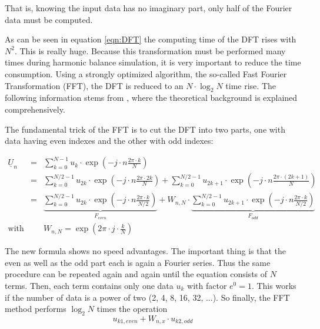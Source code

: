 \addvspace{12pt}

That is, knowing the input data has no imaginary part, only half of
the Fourier data must be computed.

\addvspace{12pt}

As can be seen in equation \ref{eqn:DFT} the computing time of the
DFT rises with $N^2$. This is really huge. Because this transformation
must be performed many times during harmonic balance simulation, it is
very important to reduce the time consumption. Using a strongly
optimized algorithm, the so-called Fast Fourier Transformation (FFT),
the DFT is reduced to an $N\cdot\log_2 N$ time rise.
The following information stems from \cite{Press},
where the theoretical background is explained comprehensively.

\addvspace{12pt}

The fundamental trick of the FFT is to cut the DFT into two parts,
one with data having even indexes and the other with odd indexes:

\begin{eqnarray}
\underline{U}_n & = &
  \sum_{k=0}^{N-1} u_k\cdot \exp\left( -j\cdot n\frac{2\pi\cdot k}{N} \right) \\
  & = & \sum_{k=0}^{N/2-1} u_{2k}\cdot
        \exp\left( -j\cdot n\frac{2\pi\cdot 2k}{N} \right) +
        \sum_{k=0}^{N/2-1} u_{2k+1}\cdot
        \exp\left( -j\cdot n\frac{2\pi\cdot (2k+1)}{N} \right) \\
  & = & \underbrace{ \sum_{k=0}^{N/2-1} u_{2k}\cdot
        \exp\left( -j\cdot n\frac{2\pi\cdot k}{N/2} \right) }_{F_{even}} +
        W_{n,N}\cdot \underbrace{ \sum_{k=0}^{N/2-1} u_{2k+1}\cdot
        \exp\left( -j\cdot n\frac{2\pi\cdot k}{N/2} \right) }_{F_{odd}} \\
\text{with} & & W_{n,N} = \exp\left( 2\pi\cdot j\cdot \frac{k}{N} \right)
\end{eqnarray}

The new formula shows no speed advantages. The important thing is that
the even as well as the odd part each is again a Fourier series. Thus
the same procedure can be repeated again and again until the equation
consists of $N$ terms. Then, each term contains only one data $u_k$
with factor $e^0=1$. This works if the number of data is a power of
two (2, 4, 8, 16, 32, ...).
So finally, the FFT method performs $\log_2 N$ times the operation
\begin{equation}
\label{eqn:FFTstep}
u_{k1,even} + W_{n,x}\cdot u_{k2,odd}
\end{equation}

